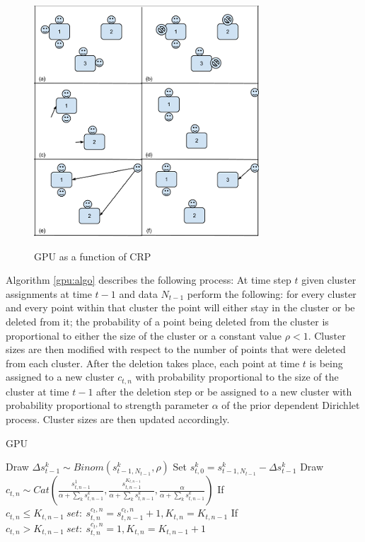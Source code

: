 \documentclass[twoside,hidelinks]{article}
\begin{document}
\begin{figure}
    \includegraphics[width=.53\textwidth]{generalPolya2}
    \label{generalPolya}
    \caption{GPU as a function of CRP}
\end{figure}


Algorithm \ref{gpu:algo} describes the following process: At time step $t$ given cluster assignments at time $t-1$ and data $N_{t-1}$ perform the following: for every cluster and every point within that cluster the point will either stay in the cluster or be deleted from it; the probability of a point being deleted from the cluster is proportional to either the size of the cluster or a constant value $\rho <1$\cite{caron}. Cluster sizes are then modified with respect to the number of points that were deleted from each cluster. After the deletion takes place, each point at time $t$ is being assigned to a new cluster $c_{t,n}$  with probability proportional to the size of the cluster at time $t-1$ after the deletion step or be assigned to a new cluster with probability proportional to strength parameter $\alpha$ of the prior dependent Dirichlet process. Cluster sizes are then updated accordingly.

\begin{algorithm}
  \caption{GPU}\label{GPU}
  \begin{algorithmic}[1]

	      \State Draw $\Delta s_{t-1}^k \sim Binom(s_{t-1,N_{t-1}}^k, \rho) $ 
	      \State Set $s_{t,0}^{k} = s_{t-1,N_{t-1}}^{k} -\Delta s_{t-1}^k$
      \EndFor
      	    \State Draw $c_{t,n} \sim Cat( \frac{ s_{t,n-1}^{1} }{\alpha + \sum_k s_{t,n-1}^{k} }, \frac{ s_{t,n-1}^{K_{t,n-1}} }{\alpha + \sum_k s_{t,n-1}^{k} } , \frac{ \alpha}{\alpha + \sum_k s_{t,n-1}^{k} }) $
      	    \State If $c_{t,n} \leq K_{t,n-1}\ set:\ s_{t,n}^{c_t,n} = s_{t,n-1}^{c_t,n} + 1 , K_{t,n} = K_{t,n-1}$
      	    \State If $c_{t,n} > K_{t,n-1}\ set:\ s_{t,n}^{c_t,n} = 1 , K_{t,n} = K_{t,n-1} + 1$
      \EndFor
    \EndProcedure
  \end{algorithmic}
  \label{gpu:algo}
\end{algorithm}
\end{document}
